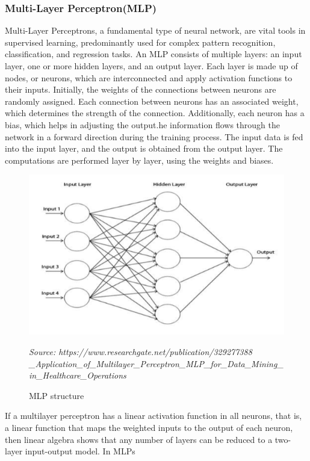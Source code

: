 \subsubsection{Multi-Layer Perceptron(MLP)}
Multi-Layer Perceptrons, a fundamental type of neural network, are vital tools in supervised learning, predominantly used for complex pattern recognition, classification, and regression tasks. An MLP consists of multiple layers: an input layer, one or more hidden layers, and an output layer. Each layer is made up of nodes, or neurons, which are interconnected and apply activation functions to their inputs.
Initially, the weights of the connections between neurons are randomly assigned. Each connection between neurons has an associated weight, which determines the strength of the connection. Additionally, each neuron has a bias, which helps in adjusting the output.he information flows through the network in a forward direction during the training process. 
The input data is fed into the input layer, and the output is obtained from the output layer. The computations are performed layer by layer, using the weights and biases.\par
\begin{figure}[h]
\centering
\includegraphics[scale=0.65]{tree.png}
\caption{MLP structure}
\textit{Source:
https://www.researchgate.net/publication/329277388 \\ \_Application\_of\_Multilayer\_Perceptron\_MLP\_for\_Data\_Mining\_in\_Healthcare\_Operations}
\end{figure}
If a multilayer perceptron has a linear activation function in all neurons, that is, a linear
function that maps the weighted inputs to the output of each neuron, then linear algebra
shows that any number of layers can be reduced to a two-layer input-output model. In MLPs
